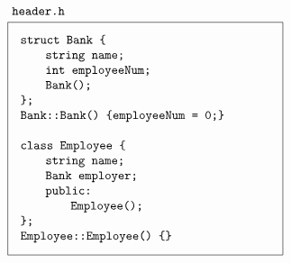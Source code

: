 \documentclass[a4paper,12pt]{article}
\newcommand\indd{${}$\hspace{20pt}}
\begin{document}
\[{\begin{tikzpicture}
\node[draw,anchor=north,inner sep=10pt] (head) at (9,0) {\parbox{7cm}{\raggedright
\texttt{struct Bank \{}\linebreak
\indd\texttt{string name;} \linebreak
\indd\texttt{int employeeNum;} \linebreak
\indd\texttt{Bank();} \linebreak
\texttt{\};}\linebreak
\texttt{Bank::Bank() \{employeeNum = 0;\}}\linebreak
\linebreak
\texttt{class Employee \{}\linebreak
\indd\texttt{string name;} \linebreak
\indd\texttt{Bank employer;} \linebreak
\indd\texttt{public:} \linebreak
\indd\indd\texttt{Employee();} \linebreak
\texttt{\};}\linebreak
\texttt{Employee::Employee() \{\}}
}};
\node[anchor=south west] at (head.north west) {\texttt{header.h\vphantom{p}}};
\end{tikzpicture}
}
\]
\end{document}
